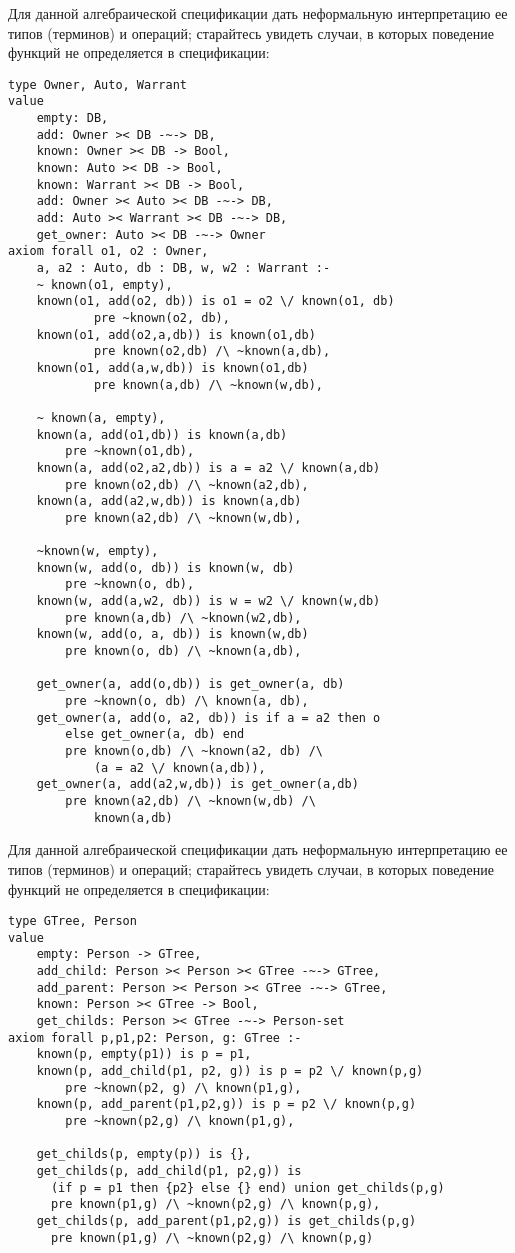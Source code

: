 \z Для данной алгебраической спецификации дать неформальную интерпретацию ее типов (терминов) и операций; старайтесь увидеть случаи, в которых поведение функций не определяется в спецификации:
\begin{lstlisting}
type Owner, Auto, Warrant
value
    empty: DB,
    add: Owner >< DB -~-> DB,
    known: Owner >< DB -> Bool,
    known: Auto >< DB -> Bool,
    known: Warrant >< DB -> Bool,
    add: Owner >< Auto >< DB -~-> DB,
    add: Auto >< Warrant >< DB -~-> DB,
    get_owner: Auto >< DB -~-> Owner
axiom forall o1, o2 : Owner,
    a, a2 : Auto, db : DB, w, w2 : Warrant :-
    ~ known(o1, empty),
    known(o1, add(o2, db)) is o1 = o2 \/ known(o1, db)
            pre ~known(o2, db),
    known(o1, add(o2,a,db)) is known(o1,db)
            pre known(o2,db) /\ ~known(a,db),
    known(o1, add(a,w,db)) is known(o1,db)
            pre known(a,db) /\ ~known(w,db),

    ~ known(a, empty),
    known(a, add(o1,db)) is known(a,db)
        pre ~known(o1,db),
    known(a, add(o2,a2,db)) is a = a2 \/ known(a,db)
        pre known(o2,db) /\ ~known(a2,db),
    known(a, add(a2,w,db)) is known(a,db)
        pre known(a2,db) /\ ~known(w,db),

    ~known(w, empty),
    known(w, add(o, db)) is known(w, db)
        pre ~known(o, db),
    known(w, add(a,w2, db)) is w = w2 \/ known(w,db)
        pre known(a,db) /\ ~known(w2,db),
    known(w, add(o, a, db)) is known(w,db)
        pre known(o, db) /\ ~known(a,db),

    get_owner(a, add(o,db)) is get_owner(a, db)
        pre ~known(o, db) /\ known(a, db),
    get_owner(a, add(o, a2, db)) is if a = a2 then o
        else get_owner(a, db) end
        pre known(o,db) /\ ~known(a2, db) /\
            (a = a2 \/ known(a,db)),
    get_owner(a, add(a2,w,db)) is get_owner(a,db)
        pre known(a2,db) /\ ~known(w,db) /\
            known(a,db)
\end{lstlisting}

\z Для данной алгебраической спецификации дать неформальную интерпретацию ее типов (терминов) и операций; старайтесь увидеть случаи, в которых поведение функций не определяется в спецификации:
\begin{lstlisting}
type GTree, Person
value
    empty: Person -> GTree,
    add_child: Person >< Person >< GTree -~-> GTree,
    add_parent: Person >< Person >< GTree -~-> GTree,
    known: Person >< GTree -> Bool,
    get_childs: Person >< GTree -~-> Person-set
axiom forall p,p1,p2: Person, g: GTree :-
    known(p, empty(p1)) is p = p1,
    known(p, add_child(p1, p2, g)) is p = p2 \/ known(p,g)
        pre ~known(p2, g) /\ known(p1,g),
    known(p, add_parent(p1,p2,g)) is p = p2 \/ known(p,g)
        pre ~known(p2,g) /\ known(p1,g),

    get_childs(p, empty(p)) is {},
    get_childs(p, add_child(p1, p2,g)) is
      (if p = p1 then {p2} else {} end) union get_childs(p,g)
      pre known(p1,g) /\ ~known(p2,g) /\ known(p,g),
    get_childs(p, add_parent(p1,p2,g)) is get_childs(p,g)
      pre known(p1,g) /\ ~known(p2,g) /\ known(p,g)
\end{lstlisting}

